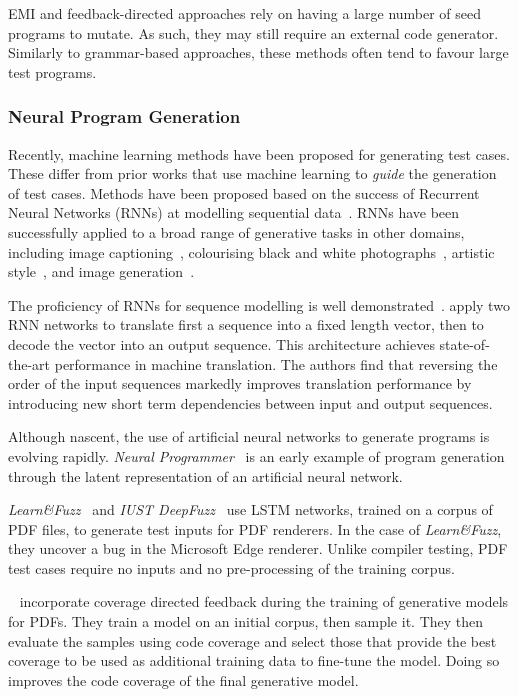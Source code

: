 EMI and feedback-directed approaches rely on having a large number of seed programs to mutate. As such, they may still require an external code generator. Similarly to grammar-based approaches, these methods often tend to favour large test programs.


\subsubsection{Neural Program Generation}
\label{subsec:related-work-neural-program-generation}

Recently, machine learning methods have been proposed for generating test cases. These differ from prior works that use machine learning to \emph{guide} the generation of test cases. Methods have been proposed based on the success of Recurrent Neural Networks (RNNs) at modelling sequential data~\cite{Jozefowicz2016a}. RNNs have been successfully applied to a broad range of generative tasks in other domains, including image captioning~\cite{Vinyals}, colourising black and white photographs~\cite{Zhang2016}, artistic style~\cite{Gatys2015}, and image generation~\cite{Gregor2014}.

The proficiency of RNNs for sequence modelling is well demonstrated~\cite{Sutskever2014}. \citeauthor{Sutskever2014} apply two RNN networks to translate first a sequence into a fixed length vector, then to decode the vector into an output sequence. This architecture achieves state-of-the-art performance in machine translation. The authors find that reversing the order of the input sequences markedly improves translation performance by introducing new short term dependencies between input and output sequences.

Although nascent, the use of artificial neural networks to generate programs is evolving rapidly. \emph{Neural Programmer}~\cite{Neelakantan2016} is an early example of program generation through the latent representation of an artificial neural network.

\emph{Learn\&Fuzz}~\cite{Godefroid2017} and \emph{IUST DeepFuzz}~\cite{Nasrabadi2018} use LSTM networks, trained on a corpus of PDF files, to generate test inputs for PDF renderers. In the case of \emph{Learn\&Fuzz}, they uncover a bug in the Microsoft Edge renderer. Unlike compiler testing, PDF test cases require no inputs and no pre-processing of the training corpus.

\citeauthor{Jitsunari2019}~\cite{Jitsunari2019} incorporate coverage directed feedback during the training of generative models for PDFs. They train a model on an initial corpus, then sample it. They then evaluate the samples using code coverage and select those that provide the best coverage to be used as additional training data to fine-tune the model. Doing so improves the code coverage of the final generative model.

